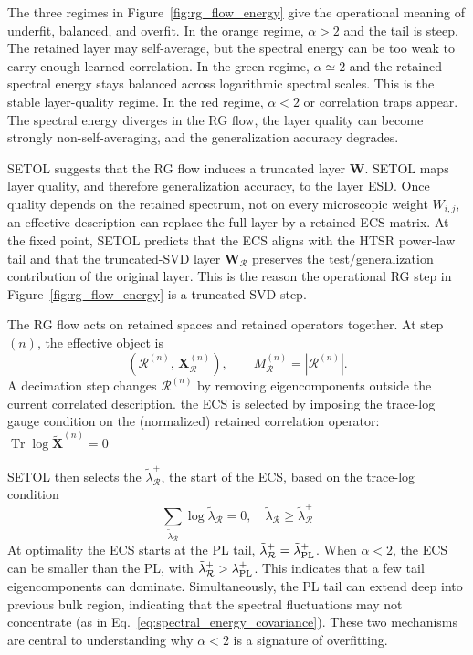 \documentclass[10pt,twocolumn]{article}
\newcommand{\Tr}{\operatorname{Tr}}
\newcommand{\W}{\mathbf W}
\newcommand{\X}{\mathbf X}
\newcommand{\Xtilde}{\widetilde{\mathbf X}}
\newcommand{\Rell}{\mathcal R}
\newcommand{\ECSstart}{\tilde{\lambda}^{+}_{\Rell}}
\newcommand{\PLstart}{\lambda^{+}_{\rm PL}}
\newcommand{\Mred}{M_{\Rell}}
\begin{document}
The three regimes in Figure~\ref{fig:rg_flow_energy} give the operational meaning of underfit, balanced, and overfit.  In the orange regime, $\alpha>2$ and the tail is steep.  The retained layer may self-average, but the spectral energy can be too weak to carry enough learned correlation.  In the green regime, $\alpha\simeq2$ and the retained spectral energy stays balanced across logarithmic spectral scales.  This is the stable layer-quality regime.  In the red regime, $\alpha<2$ or correlation traps appear.  The spectral energy diverges in the RG flow, the layer quality can become strongly non-self-averaging, and
the generalization accuracy degrades.

SETOL suggests that the RG flow induces a truncated layer $\W$.  SETOL maps layer quality, and therefore generalization accuracy, to the layer ESD.  Once quality depends on the retained spectrum, not on every microscopic weight $W_{i,j}$, an effective description can replace the full layer by a retained ECS matrix.  At the fixed point, SETOL predicts that the ECS aligns with the HTSR power-law tail and that the truncated-SVD layer $\W_{\Rell}$ preserves the test/generalization contribution of the original layer.  This is the reason the operational RG step in Figure~\ref{fig:rg_flow_energy} is a truncated-SVD step.

The RG flow acts on retained spaces and retained operators together.  At step $(n)$, the effective object is
\begin{equation}
    \left(\Rell^{(n)},\,\X_{\Rell}^{(n)}\right),
    \qquad
    \Mred^{(n)}=|\Rell^{(n)}| .
    \label{eq:flowpair_operational_v5}
\end{equation}
A decimation step changes $\Rell^{(n)}$ by removing eigencomponents outside the current correlated description.
the ECS is selected by imposing the trace-log gauge condition on the (normalized) retained correlation operator:  $\Tr{\log\Xtilde^{(n)}}=0$


SETOL then selects the $\ECSstart$, the start of the ECS, based
on the trace-log condition 
\begin{equation}
  \sum_{\tilde{\lambda}_{\Rell}} \log \tilde{\lambda}_{\Rell} = 0,\quad\tilde{\lambda}_{\Rell}\ge\ECSstart
\end{equation}
At optimality the ECS starts at the PL tail, $\tilde{\lambda}^{+}_{\Rell}=\tilde{\lambda}^{+}_{\rm PL}$.
When $\alpha<2$, the ECS can be smaller than the PL, with  $\ECSstart > \PLstart$.
This indicates that a few tail eigencomponents can dominate.
Simultaneously, the PL tail can extend deep into previous bulk region,
indicating that the spectral fluctuations may not concentrate (as in Eq.~\ref{eq:spectral_energy_covariance}).
These two mechanisms are central to understanding why $\alpha<2$ is a signature of overfitting.
\end{document}
